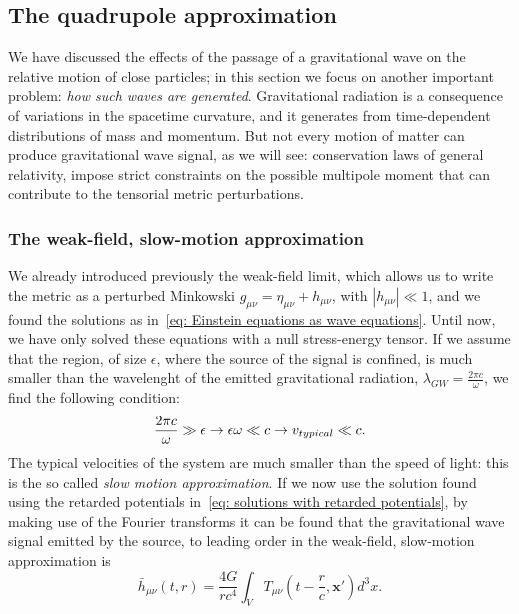 \subsection{The quadrupole approximation}
We have discussed the effects of the passage of a gravitational wave on the relative motion of close particles; in this section we focus on another important problem: \textit{how such waves are generated}.
Gravitational radiation is a consequence of variations in the spacetime curvature, and it generates from time-dependent distributions of mass and momentum.
But not every motion of matter can produce gravitational wave signal, as we will see: conservation laws of general relativity, impose strict constraints on the possible multipole moment that can contribute to the tensorial metric perturbations.


\subsubsection{The weak-field, slow-motion approximation}
We already introduced previously the weak-field limit, which allows us to write the metric as a perturbed Minkowski $g_{\mu\nu}=\eta_{\mu\nu} + h_{\mu\nu}$, with $|h_{\mu\nu}|\ll 1$, and we found the solutions as in~\eqref{eq: Einstein equations as wave equations}.
Until now, we have only solved these equations with a null stress-energy tensor.
If we assume that the region, of size $\epsilon$, where the source of the signal is confined, is much smaller than the wavelenght of the emitted gravitational radiation, $\lambda_{GW} = \frac{2\pi c}{\omega}$, we find the following condition:
\begin{equation}
    \frac{2\pi c}{\omega}\gg \epsilon \to \epsilon\omega \ll c \to v_{typical} \ll c.
    \notag
\end{equation}
The typical velocities of the system are much smaller than the speed of light: this is the so called \textit{slow motion approximation}.
If we now use the solution found using the retarded potentials in~\eqref{eq: solutions with retarded potentials}, by making use of the Fourier transforms it can be found that the gravitational wave signal emitted by the source, to leading order in the weak-field, slow-motion approximation is
\begin{equation}
    \bar{h}_{\mu\nu}(t,r) = \frac{4G}{rc^4}\int_V T_{\mu\nu}(t-\frac{r}{c}, \mathbf{x}')d^3x.
    \label{eq: weak-field slow-motion solutions}
\end{equation}

